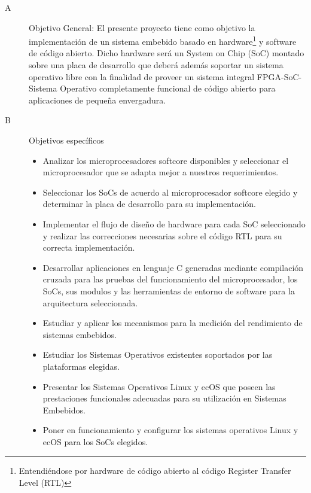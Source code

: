 \documentclass[conference]{IEEEtran}
\begin{document}
\begin {description} 
\item[A] Objetivo General: El presente proyecto tiene como objetivo la implementación de un sistema embebido basado en hardware\footnote{Entendiéndose por hardware de código abierto al código Register Transfer Level (RTL)} y software de código abierto.
Dicho hardware será un System on Chip (SoC) montado sobre una placa de desarrollo que deberá además soportar un sistema operativo
libre con la finalidad de proveer un sistema integral FPGA-SoC-Sistema
Operativo completamente funcional de código abierto para aplicaciones de pequeña envergadura.

\item[B] Objetivos específicos

 \begin{itemize}
 \item Analizar los microprocesadores softcore disponibles y seleccionar el microprocesador que se adapta mejor a nuestros requerimientos.

\item Seleccionar los SoCs de acuerdo al microprocesador softcore elegido y determinar la placa de desarrollo para su implementación.

\item Implementar el flujo de diseño de hardware para cada SoC seleccionado y realizar las correcciones necesarias sobre el código RTL para su correcta implementación. 
\item Desarrollar  aplicaciones en lenguaje C generadas mediante compilación cruzada para las pruebas del funcionamiento del microprocesador, los SoCs, sus modulos y las herramientas de entorno de software para la arquitectura seleccionada.
\item Estudiar y aplicar los mecanismos para la medición del rendimiento de sistemas embebidos. 
\item Estudiar los Sistemas Operativos existentes soportados por las plataformas elegidas.
\item Presentar los Sistemas Operativos Linux y ecOS que poseen las prestaciones funcionales adecuadas para su utilización en Sistemas Embebidos.
\item Poner en funcionamiento y configurar los sistemas operativos Linux y ecOS para los SoCs elegidos.
 \end{itemize}

\end {description}


%
%
%
\end{document}
